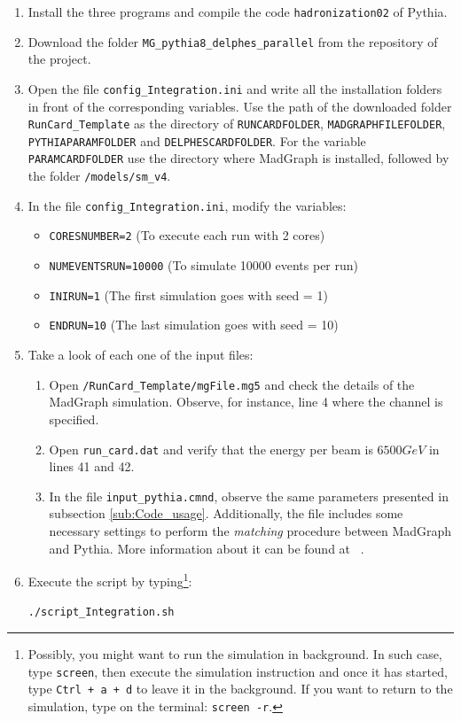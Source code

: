 \documentclass[12pt, oneside]{book}              %
\begin{document}
\begin{enumerate}
\item Install the three programs and compile the code \texttt{hadronization02}
of Pythia.
\item Download the folder \texttt{MG\_pythia8\_delphes\_parallel} from the
repository of the project.
\item Open the file \texttt{config\_Integration.ini} and write all the installation
folders in front of the corresponding variables. Use the path of the downloaded folder
\texttt{RunCard\_Template} as the directory of \texttt{RUNCARDFOLDER},
\texttt{MADGRAPHFILEFOLDER}, \texttt{PYTHIAPARAMFOLDER} and \texttt{DELPHESCARDFOLDER}.
For the variable \texttt{PARAMCARDFOLDER} use the directory where MadGraph is installed,
followed by the folder \texttt{/models/sm\_v4}.
\item In the file \texttt{config\_Integration.ini}, modify the variables:
\begin{itemize}
\item \texttt{CORESNUMBER=2}   		(To execute each run with 2 cores)
\item \texttt{NUMEVENTSRUN=10000}   (To simulate 10000 events per run)
\item \texttt{INIRUN=1}			    (The first simulation goes with seed = 1)
\item \texttt{ENDRUN=10}		    (The last simulation goes with seed = 10)
\end{itemize}
\item Take a look of each one of the input files:
\begin{enumerate}
\item Open \texttt{/RunCard\_Template/mgFile.mg5} and check the details of the
MadGraph simulation. Observe, for instance, line 4 where the channel is specified.
\item Open \texttt{run\_card.dat} and verify that the energy per beam is $ 6500 GeV $
in lines 41 and 42.
\item In the file \texttt{input\_pythia.cmnd}, observe the same parameters presented
in subsection \ref{sub:Code_usage}. Additionally, the file includes some necessary 
settings to perform the \textit{matching} procedure between MadGraph and Pythia.
More information about it can be found at ~\cite{matching}.
\end{enumerate}
\item Execute the script by typing\footnote{Possibly, you might want to run the
simulation in background. In such case, type \texttt{screen}, then execute
the simulation instruction and once it has started, type \texttt{Ctrl + a + d}
to leave it in the background. If you want to return to the simulation, type
on the terminal: \texttt{screen -r}.}:

\texttt{./script\_Integration.sh}
\end{enumerate}
\end{document}
